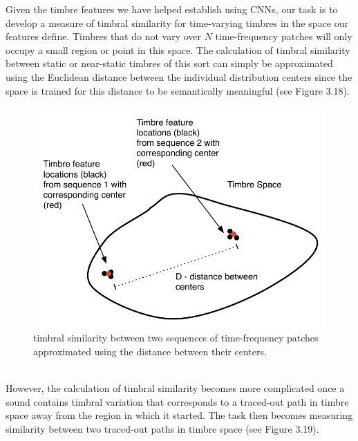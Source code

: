\documentclass[a4paper,12pt]{report} 	%
\numberwithin{figure}{chapter}
\numberwithin{table}{chapter}
\numberwithin{equation}{chapter}
\begin{document}
\begin{flushleft}
Given the timbre features we have helped establish using CNNs, our task is to develop a measure of timbral similarity for time-varying timbres in the space our features define. Timbres that do not vary over $N$ time-frequency patches will only occupy a small region or point in this space. The calculation of timbral similarity between static or near-static timbres of this sort can simply be approximated using the Euclidean distance between the individual distribution centers since the space is trained for this distance to be semantically meaningful (see Figure 3.18). 
\begin{figure}[h!]
\begin{center}
\includegraphics[scale=0.8]{TimbreDistance1}
\caption[Timbre Distance Between Centers]{timbral similarity between two sequences of time-frequency patches approximated using the distance between their centers.}
\end{center}
\end{figure}
\\
However, the calculation of timbral similarity becomes more complicated once a sound contains timbral variation that corresponds to a traced-out path in timbre space away from the region in which it started. The task then becomes measuring similarity between two traced-out paths in timbre space (see Figure 3.19).
\begin{figure}[h!]
\begin{center}

\end{center}
\end{figure}
\end{flushleft}
\end{document}
